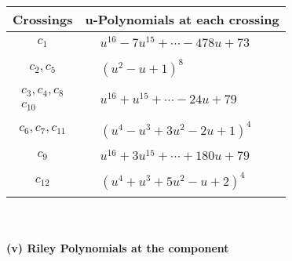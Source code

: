 \documentclass[1p]{elsarticle_modified}
\theoremstyle{definition}
\begin{document}
\begin{tabular}{m{50pt}|m{274pt}}
Crossings & \hspace{64pt}u-Polynomials at each crossing \\
\hline $$\begin{aligned}c_{1}\end{aligned}$$&$\begin{aligned}
&u^{16}-7 u^{15}+\cdots-478 u+73
\end{aligned}$\\
\hline $$\begin{aligned}c_{2},c_{5}\end{aligned}$$&$\begin{aligned}
&(u^2- u+1)^8
\end{aligned}$\\
\hline $$\begin{aligned}c_{3},c_{4},c_{8}\\c_{10}\end{aligned}$$&$\begin{aligned}
&u^{16}+u^{15}+\cdots-24 u+79
\end{aligned}$\\
\hline $$\begin{aligned}c_{6},c_{7},c_{11}\end{aligned}$$&$\begin{aligned}
&(u^4- u^3+3 u^2-2 u+1)^4
\end{aligned}$\\
\hline $$\begin{aligned}c_{9}\end{aligned}$$&$\begin{aligned}
&u^{16}+3 u^{15}+\cdots+180 u+79
\end{aligned}$\\
\hline $$\begin{aligned}c_{12}\end{aligned}$$&$\begin{aligned}
&(u^4+u^3+5 u^2- u+2)^4
\end{aligned}$\\
\hline
\end{tabular}\\~\\
\newpage\renewcommand{\arraystretch}{1}
\flushleft \textbf{(v) Riley Polynomials at the component}\newline \\
\end{document}
